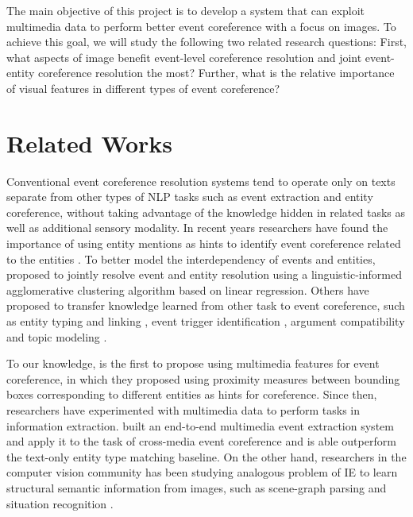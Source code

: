 \documentclass[11pt,a4paper]{article}
\begin{document}
The main objective of this project is to develop a system that can exploit multimedia data to perform better event coreference with a focus on images. To achieve this goal, we will study the following two related research questions: First, what aspects of image benefit event-level coreference resolution and joint event-entity coreference resolution the most? Further, what is the relative importance of visual features in different types of event coreference? 

\section{Related Works}
Conventional event coreference resolution systems tend to operate only on texts separate from other types of NLP tasks such as event extraction and entity coreference, without taking advantage of the knowledge hidden in related tasks as well as additional sensory modality. In recent years researchers have found the importance of using entity mentions as hints to identify event coreference related to the entities \cite{Lee2012-joint-entity-event-coref, Lu2016-joint-event-coref, Barhom2019-joint-coref}. To better model the interdependency of events and entities, \cite{Lee2012-joint-entity-event-coref} proposed to jointly resolve event and entity resolution using a linguistic-informed agglomerative clustering algorithm based on linear regression. Others have proposed to transfer knowledge learned from other task to event coreference, such as entity typing and linking \cite{durrett-klein-2011-empirical}, event trigger identification \cite{Araki2015}, argument compatibility \cite{Huang2019-argument-compatibility} and topic modeling \cite{Choubey2018}.  

To our knowledge, \cite{Zhang2015-multimedia-coref} is the first to propose using multimedia features for event coreference, in which they proposed using proximity measures between bounding boxes corresponding to different entities as hints for coreference. Since then, researchers have experimented with multimedia data to perform tasks in information extraction. \cite{Li2020-crossmedia-ie} built an end-to-end multimedia event extraction system and apply it to the task of cross-media event coreference and is able outperform the text-only entity type matching baseline. On the other hand, researchers in the computer vision community has been studying analogous problem of IE to learn structural semantic information from images, such as scene-graph parsing and situation recognition \cite{Zellers2018-neural-motifs}.
\end{document}
